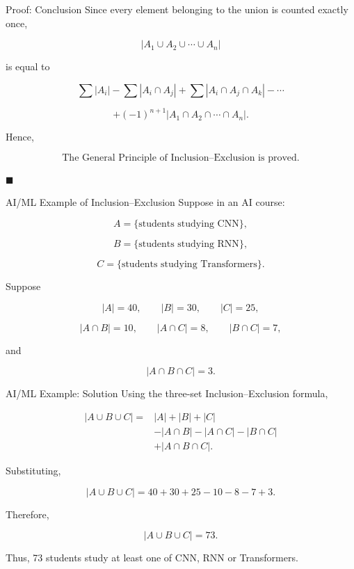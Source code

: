 \documentclass[aspectratio=169]{beamer}
\begin{document}
\begin{frame}{Proof: Conclusion}
Since every element belonging to the union is counted exactly once,

\[
|A_1\cup A_2\cup\cdots\cup A_n|
\]

is equal to

\[
\sum |A_i|
-\sum |A_i\cap A_j|
+\sum |A_i\cap A_j\cap A_k|
-\cdots
\]

\[
+(-1)^{n+1}
|A_1\cap A_2\cap\cdots\cap A_n|.
\]

Hence,

\[
\boxed{\text{The General Principle of Inclusion--Exclusion is proved.}}
\]

\hfill$\blacksquare$
\end{frame}

\begin{frame}{AI/ML Example of Inclusion--Exclusion}
Suppose in an AI course:

\[
A=\{\text{students studying CNN}\},
\]

\[
B=\{\text{students studying RNN}\},
\]

\[
C=\{\text{students studying Transformers}\}.
\]

Suppose

\[
|A|=40,\qquad |B|=30,\qquad |C|=25,
\]

\[
|A\cap B|=10,\qquad
|A\cap C|=8,\qquad
|B\cap C|=7,
\]

and

\[
|A\cap B\cap C|=3.
\]
\end{frame}

\begin{frame}{AI/ML Example: Solution}
Using the three-set Inclusion--Exclusion formula,

\[
\begin{aligned}
|A\cup B\cup C|
={}&|A|+|B|+|C|\\
&-|A\cap B|-|A\cap C|-|B\cap C|\\
&+|A\cap B\cap C|.
\end{aligned}
\]

Substituting,

\[
|A\cup B\cup C|
=40+30+25-10-8-7+3.
\]

Therefore,

\[
\boxed{|A\cup B\cup C|=73}.
\]

Thus, 73 students study at least one of CNN, RNN or Transformers.
\end{frame}
\end{document}
